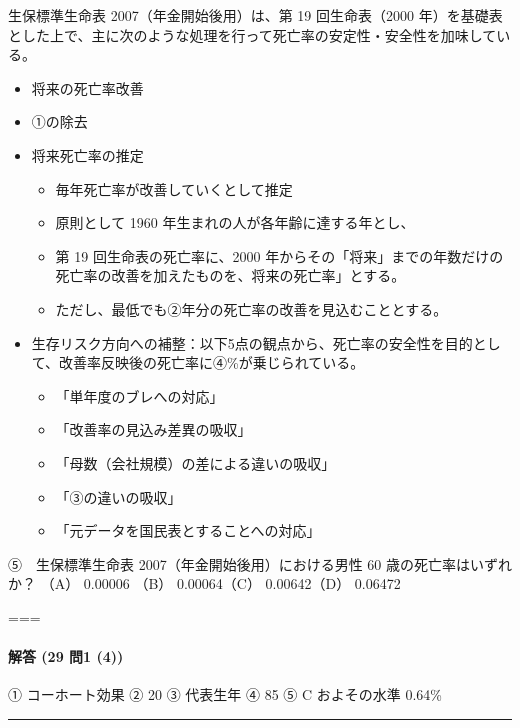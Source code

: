\documentclass[]{article}
\begin{document}
生保標準生命表 2007（年金開始後用）は、第 19 回生命表（2000
年）を基礎表とした上で、主に次のような処理を行って死亡率の安定性・安全性を加味している。

\begin{itemize}
\tightlist
\item
  将来の死亡率改善
\item
  ①の除去
\item
  将来死亡率の推定

  \begin{itemize}
  \tightlist
  \item
    毎年死亡率が改善していくとして推定
  \item
    原則として 1960 年生まれの人が各年齢に達する年とし、
  \item
    第 19 回生命表の死亡率に、2000
    年からその「将来」までの年数だけの死亡率の改善を加えたものを、将来の死亡率」とする。
  \item
    ただし、最低でも②年分の死亡率の改善を見込むこととする。
  \end{itemize}
\item
  生存リスク方向への補整：以下5点の観点から、死亡率の安全性を目的として、改善率反映後の死亡率に④\%が乗じられている。

  \begin{itemize}
  \tightlist
  \item
    「単年度のブレへの対応」
  \item
    「改善率の見込み差異の吸収」
  \item
    「母数（会社規模）の差による違いの吸収」
  \item
    「③の違いの吸収」
  \item
    「元データを国民表とすることへの対応」
  \end{itemize}
\end{itemize}

⑤　生保標準生命表 2007（年金開始後用）における男性 60
歳の死亡率はいずれか？ （A） 0.00006 （B） 0.00064（C） 0.00642（D）
0.06472

===

\hypertarget{ux89e3ux7b54-29-ux554f1-4}{%
\paragraph{解答 (29 問1 (4))}\label{ux89e3ux7b54-29-ux554f1-4}}

① コーホート効果 ② 20 ③ 代表生年 ④ 85 ⑤ C およその水準 0.64\%

\begin{center}\rule{0.5\linewidth}{0.5pt}\end{center}
\end{document}
